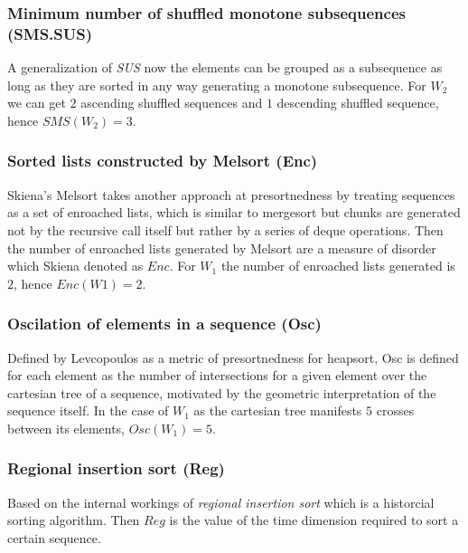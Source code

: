 \subsubsection{Minimum number of shuffled monotone subsequences (SMS.SUS)}
A generalization of \textit{SUS} now the elements can be grouped as a subsequence as long as they are sorted in any way generating a monotone subsequence. For $W_2$ we can get $2$ ascending shuffled sequences\cite{Carlsson_Levcopoulos_Petersson_1993} and $1$ descending shuffled sequence, hence $SMS(W_2) = 3$.


\subsubsection{Sorted lists constructed by Melsort (Enc)}
Skiena's Melsort \cite{Skiena_1988} takes another approach at presortnedness by treating sequences as a set of enroached lists, which is similar to mergesort but chunks are generated not by the recursive call itself but rather by a series of deque operations\cite{Baeza-Yates_Manber_1992}. Then the number of enroached lists generated by Melsort are a measure of disorder which Skiena denoted as $Enc$. For $W_1$ the number of enroached lists generated is $2$, hence $Enc(W1)=2$.

\subsubsection{Oscilation of elements in a sequence (Osc)}
Defined by Levcopoulos as a metric of presortnedness for heapsort, Osc is defined for each element as the number of intersections for a given element over the cartesian tree of a sequence\cite{Levcopoulos_Petersson_1993}, motivated by the geometric interpretation of the sequence itself. In the case of $W_1$ as the cartesian tree manifests $5$ crosses between its  elements, $Osc(W_1) = 5$.

\subsubsection{Regional insertion sort (Reg)}
Based on the internal workings of \textit{regional insertion sort}\cite{Cantoni_Creutzburg_Levialdi_Wolf_1989} which is a historcial sorting algorithm. Then $Reg$ is the value of the time dimension required to sort a certain sequence. %
